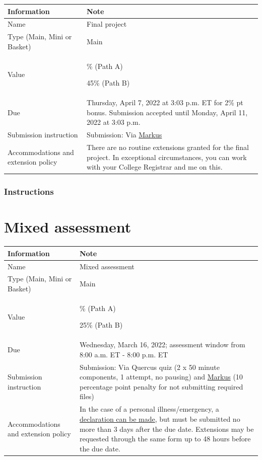 \documentclass[
  openany]{book}
\begin{document}
\begin{longtable}[]{@{}
  >{\raggedright\arraybackslash}p{}
  >{\raggedright\arraybackslash}p{}@{}}
\toprule
\textbf{Information} & \textbf{Note} \\
\midrule
\endhead
Name & Final project \\
Type (Main, Mini or Basket) & Main \\
Value & 45\% (Path A)

45\% (Path B) \\
Due & Thursday, April 7, 2022 at 3:03 p.m. ET for 2\% pt bonus. Submission accepted until Monday, April 11, 2022 at 3:03 p.m. \\
Submission instruction & Submission: Via \href{https://markus-ds.teach.cs.toronto.edu/}{Markus} \\
Accommodations and extension policy & There are no routine extensions granted for the final project. In exceptional circumstances, you can work with your College Registrar and me on this. \\
\bottomrule
\end{longtable}

\hypertarget{instructions-3}{%
\subsection{Instructions}\label{instructions-3}}

\hypertarget{mixed-assessment}{%
\chapter{Mixed assessment}\label{mixed-assessment}}

\begin{longtable}[]{@{}
  >{\raggedright\arraybackslash}p{}
  >{\raggedright\arraybackslash}p{}@{}}
\toprule
\textbf{Information} & \textbf{Note} \\
\midrule
\endhead
Name & Mixed assessment \\
Type (Main, Mini or Basket) & Main \\
Value & 20\% (Path A)

25\% (Path B) \\
Due & Wednesday, March 16, 2022; assessment window from 8:00 a.m. ET - 8:00 p.m. ET \\
Submission instruction & Submission: Via Quercus quiz (2 x 50 minute components, 1 attempt, no pausing) and \href{https://markus-ds.teach.cs.toronto.edu/}{Markus} (10 percentage point penalty for not submitting required files) \\
Accommodations and extension policy & In the case of a personal illness/emergency, a \href{https://forms.office.com/Pages/ResponsePage.aspx?id=JsKqeAMvTUuQN7RtVsVSEOKHUU3SzAJJhmOKjJhDWEpUNTFDSzhZTFlXUzVYMVlNM1FEUTRZMkVWOC4u}{declaration can be made}, but must be submitted no more than 3 days after the due date. Extensions may be requested through the same form up to 48 hours before the due date. \\
\bottomrule
\end{longtable}
\end{document}
